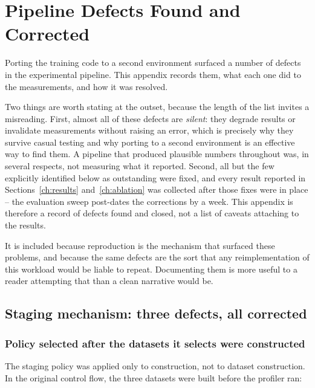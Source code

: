 \section{Pipeline Defects Found and Corrected}
\label{app:defects}

Porting the training code to a second environment surfaced a number of defects in
the experimental pipeline. This appendix records them, what each one did to the
measurements, and how it was resolved.

Two things are worth stating at the outset, because the length of the list
invites a misreading. First, almost all of these defects are \emph{silent}: they
degrade results or invalidate measurements without raising an error, which is
precisely why they survive casual testing and why porting to a second
environment is an effective way to find them. A pipeline that produced plausible
numbers throughout was, in several respects, not measuring what it reported.
Second, all but the few explicitly identified below as outstanding were fixed,
and every result reported in Sections~\ref{ch:results} and~\ref{ch:ablation} was
collected after those fixes were in place -- the evaluation sweep post-dates the
corrections by a week. This appendix is therefore a record of defects found and
closed, not a list of caveats attaching to the results.

It is included because reproduction is the mechanism that surfaced these
problems, and because the same defects are the sort that any reimplementation of
this workload would be liable to repeat. Documenting them is more useful to a
reader attempting that than a clean narrative would be.

\subsection{Staging mechanism: three defects, all corrected}

\subsubsection{Policy selected after the datasets it selects were constructed}
\label{sec:defect-ordering}

The staging policy was applied only to  construction, not to
dataset construction.
In the original control flow, the three datasets were built before the profiler ran:

